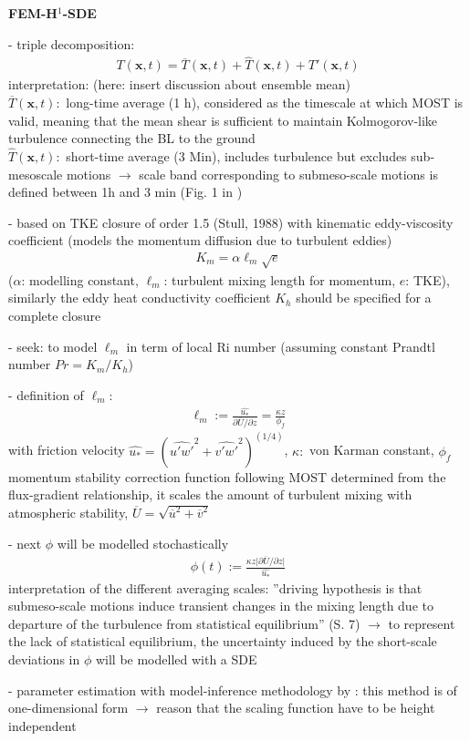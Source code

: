 \documentclass[11pt]{article}
\begin{document}
\textbf{FEM-H$^1$-SDE} \citep{BoykoDiss2022,BoykoPaper2022} 
	\begin{compactenum}
		\item[-] triple decomposition:
		\begin{align}
			T(\boldsymbol{x},t) = \overline{T}(\boldsymbol{x},t) + \widehat{T}(\boldsymbol{x},t) + T'(\boldsymbol{x},t)
		\end{align}
		interpretation: (here: insert discussion about ensemble mean) \\
		$\overline{T}(\boldsymbol{x},t):$ long-time average (1 h), considered as the timescale at which MOST is valid, meaning that the mean shear is sufficient to maintain Kolmogorov-like turbulence connecting the BL to the ground \\
		$\widehat{T}(\boldsymbol{x},t):$ short-time average (3 Min), includes turbulence but excludes sub-mesoscale motions $\rightarrow$ scale band corresponding to submeso-scale motions is defined between 1h and 3 min (Fig. 1 in \citet{BoykoPaper2022})
		\item[-] based on TKE closure of order 1.5 (Stull, 1988) with kinematic eddy-viscosity coefficient (models the momentum diffusion due to turbulent eddies)
		\begin{align}
			K_m = \alpha \ell_m \sqrt{e}
		\end{align}
	($\alpha$: modelling constant, $\ell_m$: turbulent mixing length for momentum, $e$: TKE), similarly the eddy heat conductivity coefficient $K_h$ should be specified for a complete closure
	\item[-] seek: to model $\ell_m$ in term of local Ri number (assuming constant Prandtl number $Pr = K_m/K_h$)
	\item[-] definition of $\ell_m$:
	\begin{align}
		\ell_m := \frac{\widehat{u_*}}{\partial \overline{U}/\partial z} = \frac{\kappa z}{\phi_f}
	\end{align}
with friction velocity $\widehat{u_*} = (\widehat{u'w'}^2+\widehat{v'w'}^2)^{(1/4)}$, $\kappa:$ von Karman constant, $\phi_f$ momentum stability correction function following MOST determined from the flux-gradient relationship, it scales the amount of turbulent mixing with atmospheric stability, $\overline{U} = \sqrt{\overline{u}^2+\overline{v}^2}$
	\item[-] next $\phi$ will be modelled stochastically
	\begin{align}
		\phi(t) := \frac{\kappa z \vert \partial \overline{U} / \partial z \vert}{\widehat{u_*}}
	\end{align}
	interpretation of the different averaging scales: ''driving hypothesis is that submeso-scale motions induce transient changes in the mixing length due to departure of the turbulence from statistical equilibrium'' (S. 7) $\rightarrow$ to represent the lack of statistical equilibrium, the uncertainty induced by the short-scale deviations in $\phi$ will be modelled with a SDE
	\item[-] parameter estimation with model-inference methodology by \citet{Boyko2021}: this method is of one-dimensional form $\rightarrow$ reason that the scaling function have to be height independent
	\end{compactenum}
	
\end{document}
